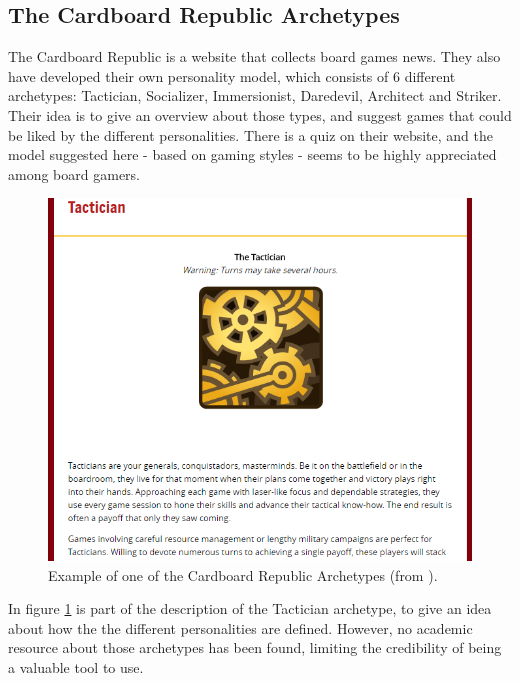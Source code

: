 \subsection{The Cardboard Republic Archetypes}
The Cardboard Republic is a website that collects board games news. They also have developed their own personality model, which consists of 6 different archetypes: Tactician, Socializer, Immersionist, Daredevil, Architect and Striker\cite{cardboard}. Their idea is to give an overview about those types, and suggest games that could be liked by the different personalities. There is a quiz on their website\cite{cardboardquiz}, and the model suggested here - based on gaming styles - seems to be highly appreciated among board gamers\cite{boardgamegeek}. 
\begin{figure}[ht]
    \centering
    \includegraphics[scale=0.7]{figure/cardboard.png}
    \caption{Example of one of the Cardboard Republic Archetypes (from \cite{cardboard}).}
    \label{fig:cardb}
\end{figure}
In figure \ref{fig:cardb} is part of the description of the Tactician archetype, to give an idea about how the the different personalities are defined.
However, no academic resource about those archetypes has been found, limiting the credibility of being a valuable tool to use.
